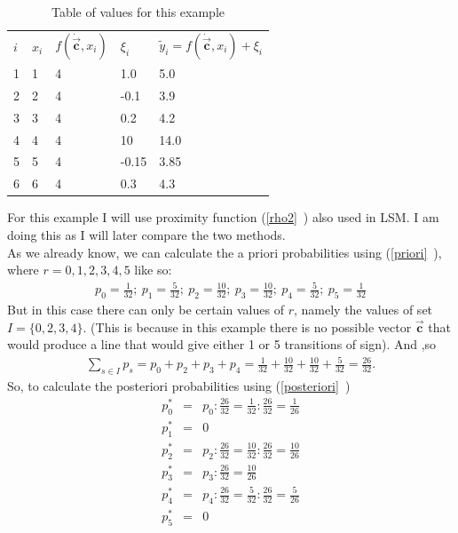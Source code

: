 \documentclass[11pt,a4paper]{article}
\numberwithin{equation}{subsection}
\newcommand{\vecc}{\vec{\textbf{c}}}
\begin{document}
\begin{table}[h!]
\caption {Table of values for this example} \label{tab:title} 
\centering
\begin{tabular}{lllll}
$i$ & $x_{i}$ & $f(\dot{\vecc},x_{i})$ & $\xi_{i}$  & $\tilde{y}_{i}=f(\dot{\vecc},x_{i})+\xi_{i}$  \\
1 & 1 & 4      & 1.0   & 5.0   \\
2 & 2 & 4      & -0.1  & 3.9   \\
3 & 3 & 4      & 0.2   & 4.2   \\
4 & 4 & 4      & 10    & 14.0  \\
5 & 5 & 4      & -0.15 & 3.85  \\
6 & 6 & 4      & 0.3   & 4.3  
\end{tabular}
\end{table}
\noindent
For this example I will use proximity function (\vref{rho2}~) also used in LSM. I am doing this as I will later compare the two methods.\\
\noindent
As we already know, we can calculate the a priori probabilities using (\vref{priori}~), where $r=0,1,2,3,4,5$ like so:
\begin{gather*}
p_{0}= \frac{1}{32}; \ p_{1}= \frac{5}{32}; \ p_{2}= \frac{10}{32}; \ p_{3}= \frac{10}{32}; \ p_{4}= \frac{5}{32}; \ p_{5}= \frac{1}{32}
\end{gather*}
But in this case there can only be certain values of $r$, namely the values of set $I=\{0,2,3,4\}$. (This is because in this example there is no possible vector $\vecc$ that would produce a line that would give either 1 or 5 transitions of sign). And ,so 
\begin{gather*}
\sum\limits_{s \in I}p_{s}=p_{0}+p_{2}+p_{3}+p_{4}= \frac{1}{32} + \frac{10}{32} + \frac{10}{32} + \frac{5}{32} = \frac{26}{32}.
\end{gather*}
So, to calculate the posteriori probabilities using (\vref{posteriori}~)
\begin{eqnarray*}
p_{0}^{*} &=& p_{0}: \frac{26}{32} = \frac{1}{32} : \frac{26}{32} = \frac{1}{26} \\
p_{1}^{*} &=& 0 \\
p_{2}^{*} &=& p_{2}: \frac{26}{32} = \frac{10}{32} : \frac{26}{32} = \frac{10}{26} \\
p_{3}^{*} &=& p_{3}: \frac{26}{32} = \frac{10}{26} \\
p_{4}^{*} &=& p_{4}: \frac{26}{32} = \frac{5}{32} : \frac{26}{32} = \frac{5}{26} \\
p_{5}^{*} &=& 0
\end{eqnarray*}
\end{document}
